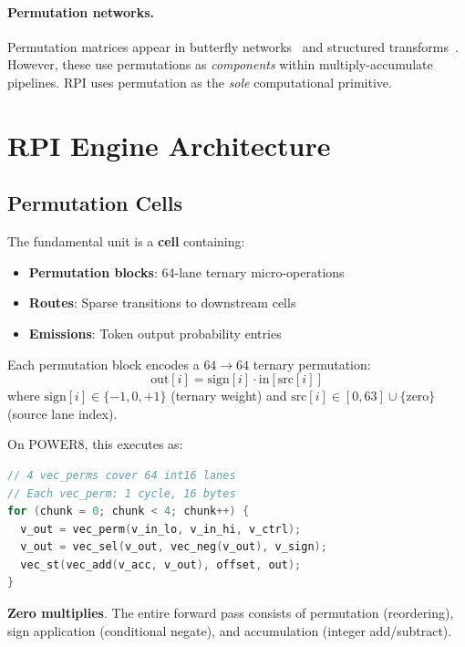 \documentclass[10pt,twocolumn]{article}
\begin{document}
\paragraph{Permutation networks.} Permutation matrices appear in butterfly networks~\cite{dao2019learning} and structured transforms~\cite{chen2019pixelated}. However, these use permutations as \emph{components} within multiply-accumulate pipelines. RPI uses permutation as the \emph{sole} computational primitive.

\section{RPI Engine Architecture}
\label{sec:engine}

\subsection{Permutation Cells}

The fundamental unit is a \textbf{cell} containing:
\begin{itemize}
\item \textbf{Permutation blocks}: 64-lane ternary micro-operations
\item \textbf{Routes}: Sparse transitions to downstream cells
\item \textbf{Emissions}: Token output probability entries
\end{itemize}

Each permutation block encodes a $64 \to 64$ ternary permutation:
\begin{equation}
\text{out}[i] = \text{sign}[i] \cdot \text{in}[\text{src}[i]]
\end{equation}
where $\text{sign}[i] \in \{-1, 0, +1\}$ (ternary weight) and $\text{src}[i] \in [0, 63] \cup \{\text{zero}\}$ (source lane index).

On POWER8, this executes as:
\begin{lstlisting}[language=C]
// 4 vec_perms cover 64 int16 lanes
// Each vec_perm: 1 cycle, 16 bytes
for (chunk = 0; chunk < 4; chunk++) {
  v_out = vec_perm(v_in_lo, v_in_hi, v_ctrl);
  v_out = vec_sel(v_out, vec_neg(v_out), v_sign);
  vec_st(vec_add(v_acc, v_out), offset, out);
}
\end{lstlisting}

\textbf{Zero multiplies}. The entire forward pass consists of permutation (reordering), sign application (conditional negate), and accumulation (integer add/subtract).
\end{document}
